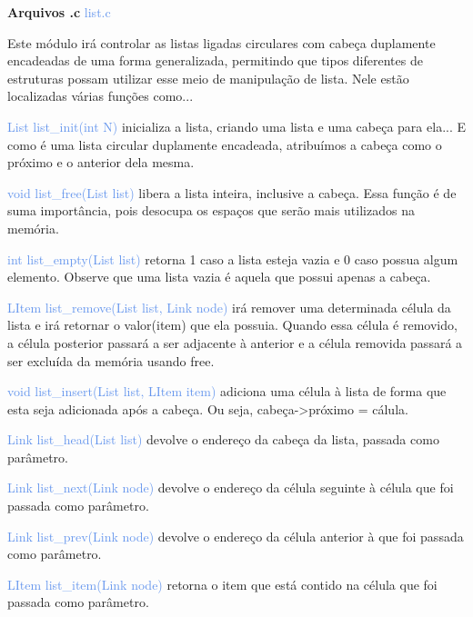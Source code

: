 \documentclass[a4paper,12pt]{article}
\begin{document}
\bigskip
\bigskip
\bigskip

\newpage %

\bigskip
\bigskip

{\Large \textcolor{NavyBlue}{ \textbf{Arquivos .c  }}}{\large \textcolor{CornflowerBlue}{  list.c}}
\bigskip

Este módulo irá controlar as listas ligadas circulares com cabeça duplamente encadeadas de uma forma generalizada, permitindo que tipos diferentes de estruturas possam utilizar esse meio de manipulação de lista.
Nele estão localizadas várias funções como...

{\textcolor{CornflowerBlue}{List list\_init(int N)}} inicializa a lista, criando uma lista e uma cabeça para ela... E como é uma lista circular duplamente encadeada, atribuímos a cabeça como o próximo e o anterior dela mesma.

{\textcolor{CornflowerBlue}{void list\_free(List list)}} libera a lista inteira, inclusive a cabeça. Essa função é de suma importância, pois desocupa os espaços que serão mais utilizados na memória.

{\textcolor{CornflowerBlue}{int list\_empty(List list)}} retorna 1 caso a lista esteja vazia e 0 caso possua algum elemento.
Observe que uma lista vazia é aquela que possui apenas a cabeça. 

{\textcolor{CornflowerBlue}{LItem list\_remove(List list, Link node)}} irá remover uma determinada célula da lista e irá retornar o valor(item) que ela possuia.
Quando essa célula é removido, a célula posterior passará a ser adjacente à anterior e a célula removida passará a ser excluída da memória usando free.

{\textcolor{CornflowerBlue}{void list\_insert(List list, LItem item)}} adiciona uma célula à lista de forma que esta seja adicionada após a cabeça. Ou seja, cabeça->próximo = cálula. 

{\textcolor{CornflowerBlue}{Link  list\_head(List list)}} devolve o endereço da cabeça da lista, passada como parâmetro.

{\textcolor{CornflowerBlue}{Link  list\_next(Link node)}} devolve o endereço da célula seguinte à célula que foi passada como parâmetro.

{\textcolor{CornflowerBlue}{Link  list\_prev(Link node)}} devolve o endereço da célula anterior à que foi passada como parâmetro.

{\textcolor{CornflowerBlue}{LItem list\_item(Link node)}} retorna o item que está contido na célula que foi passada como parâmetro.
\end{document}
